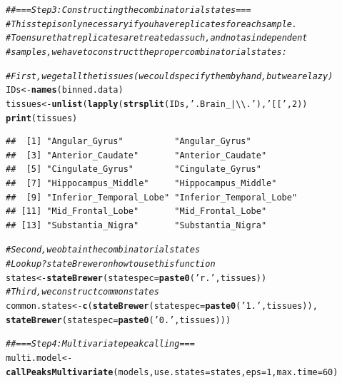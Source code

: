 \documentclass[11pt]{article}\usepackage[]{graphicx}\usepackage[]{color}
\makeatletter
\newcommand{\hlnum}[1]{\textcolor[rgb]{0.686,0.059,0.569}{#1}}%
\newcommand{\hlstr}[1]{\textcolor[rgb]{0.192,0.494,0.8}{#1}}%
\newcommand{\hlcom}[1]{\textcolor[rgb]{0.678,0.584,0.686}{\textit{#1}}}%
\newcommand{\hlstd}[1]{\textcolor[rgb]{0.345,0.345,0.345}{#1}}%
\newcommand{\hlkwb}[1]{\textcolor[rgb]{0.69,0.353,0.396}{#1}}%
\newcommand{\hlkwc}[1]{\textcolor[rgb]{0.333,0.667,0.333}{#1}}%
\newcommand{\hlkwd}[1]{\textcolor[rgb]{0.737,0.353,0.396}{\textbf{#1}}}%
\newenvironment{kframe}{%
 \def\at@end@of@kframe{}%
 \ifinner\ifhmode%
  \def\at@end@of@kframe{\end{minipage}}%
  \begin{minipage}{\columnwidth}%
 \fi\fi%
 \def\FrameCommand##1{\hskip\@totalleftmargin \hskip-\fboxsep
 \colorbox{shadecolor}{##1}\hskip-\fboxsep
     \hskip-\linewidth \hskip-\@totalleftmargin \hskip\columnwidth}%
 \MakeFramed {\advance\hsize-\width
   \@totalleftmargin\z@ \linewidth\hsize
   \@setminipage}}%
 {\par\unskip\endMakeFramed%
 \at@end@of@kframe}
\newenvironment{knitrout}{}{} %
\makeatother
\begin{document}
\begin{scriptsize}
\begin{knitrout}
\color{fgcolor}\begin{kframe}
\begin{alltt}
\hlcom{## === Step 3: Constructing the combinatorial states ===}
\hlcom{# This step is only necessary if you have replicates for each sample.}
\hlcom{# To ensure that replicates are treated as such, and not as independent}
\hlcom{# samples, we have to construct the proper combinatorial states:}

\hlcom{# First, we get all the tissues (we could specify them by hand, but we are lazy)}
\hlstd{IDs} \hlkwb{<-} \hlkwd{names}\hlstd{(binned.data)}
\hlstd{tissues} \hlkwb{<-} \hlkwd{unlist}\hlstd{(}\hlkwd{lapply}\hlstd{(}\hlkwd{strsplit}\hlstd{(IDs,} \hlstr{'.Brain_|\textbackslash{}\textbackslash{}.'}\hlstd{),} \hlstr{'[['}\hlstd{,} \hlnum{2}\hlstd{))}
\hlkwd{print}\hlstd{(tissues)}
\end{alltt}
\begin{verbatim}
##  [1] "Angular_Gyrus"          "Angular_Gyrus"         
##  [3] "Anterior_Caudate"       "Anterior_Caudate"      
##  [5] "Cingulate_Gyrus"        "Cingulate_Gyrus"       
##  [7] "Hippocampus_Middle"     "Hippocampus_Middle"    
##  [9] "Inferior_Temporal_Lobe" "Inferior_Temporal_Lobe"
## [11] "Mid_Frontal_Lobe"       "Mid_Frontal_Lobe"      
## [13] "Substantia_Nigra"       "Substantia_Nigra"
\end{verbatim}
\begin{alltt}
\hlcom{# Second, we obtain the combinatorial states}
\hlcom{# Look up ?stateBrewer on how to use this function}
\hlstd{states} \hlkwb{<-} \hlkwd{stateBrewer}\hlstd{(}\hlkwc{statespec} \hlstd{=} \hlkwd{paste0}\hlstd{(}\hlstr{'r.'}\hlstd{, tissues))}
\hlcom{# Third, we construct common states}
\hlstd{common.states} \hlkwb{<-} \hlkwd{c}\hlstd{(}\hlkwd{stateBrewer}\hlstd{(}\hlkwc{statespec} \hlstd{=} \hlkwd{paste0}\hlstd{(}\hlstr{'1.'}\hlstd{, tissues)),}
                   \hlkwd{stateBrewer}\hlstd{(}\hlkwc{statespec} \hlstd{=} \hlkwd{paste0}\hlstd{(}\hlstr{'0.'}\hlstd{, tissues)))}
\end{alltt}
\end{kframe}
\end{knitrout}

\begin{knitrout}
\color{fgcolor}\begin{kframe}
\begin{alltt}
\hlcom{## === Step 4: Multivariate peak calling ===}
\hlstd{multi.model} \hlkwb{<-} \hlkwd{callPeaksMultivariate}\hlstd{(models,} \hlkwc{use.states}\hlstd{=states,} \hlkwc{eps}\hlstd{=}\hlnum{1}\hlstd{,} \hlkwc{max.time}\hlstd{=}\hlnum{60}\hlstd{)}
\end{alltt}



\end{kframe}
\end{knitrout}
\end{scriptsize}
\end{document}

